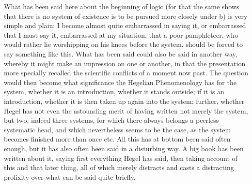 \documentclass[12pt,a4paper,openany]{book}
\newcommand{\opage}[1]{\marginnote{\footnotesize\textit{[#1]}}}
\begin{document}
What has been said here about the beginning of logic (for that the same shows that
there is no system of existence is to be pursued more closely under b) is very simple
and plain; I become almost quite embarrassed in saying it, or embarrassed that I must
say it, embarrassed at my situation, that a poor pamphleteer,
\setcounter{footnote}{0}%
\opage{178}who would rather lie worshipping on his knees before the system, should be forced
to say something like this. What has been said could also be said in another way,
whereby it might make an impression on one or another, in that the presentation more
specially recalled the scientific conflicts of a moment now past. The question would
then become what significance the Hegelian Phenomenology has for the system, whether
it is an introduction, whether it stands outside; if it is an introduction, whether
it is then taken up again into the system; further, whether Hegel has not even the
astounding merit of having written not merely the system, but two, indeed three
systems, for which there always belongs a peerless systematic head, and which
nevertheless seems to be the case, as the system becomes finished more than once etc.
All this has at bottom been said often enough, but it has also often been said in a
disturbing way. A big book has been written about it, saying first everything Hegel
has said, then taking account of this and that later thing, all of which merely
distracts and casts a distracting prolixity over what can be said quite briefly.
\end{document}
